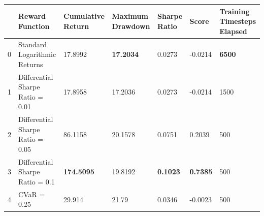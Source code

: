 \begin{tabular}{lllllll}
\toprule
 & Reward Function & Cumulative Return & Maximum Drawdown & Sharpe Ratio & Score & Training Timesteps Elapsed \\
\midrule
0 & Standard Logarithmic Returns & 17.8992 & \textbf{17.2034} & 0.0273 & -0.0214 & \textbf{6500} \\
1 & Differential Sharpe Ratio = 0.01 & 17.8958 & 17.2036 & 0.0273 & -0.0214 & 1500 \\
2 & Differential Sharpe Ratio = 0.05 & 86.1158 & 20.1578 & 0.0751 & 0.2039 & 500 \\
3 & Differential Sharpe Ratio = 0.1 & \textbf{174.5095} & 19.8192 & \textbf{0.1023} & \textbf{0.7385} & 500 \\
4 & CVaR = 0.25 & 29.914 & 21.79 & 0.0346 & -0.0023 & 500 \\
\bottomrule
\end{tabular}
